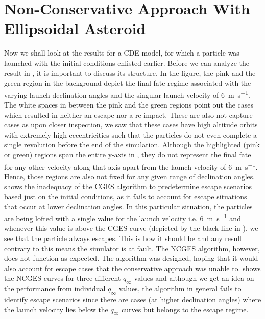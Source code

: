 \section{Non-Conservative Approach With Ellipsoidal Asteroid}
\label{sec:nonconservative_escape_cde_results}
Now we shall look at the results for a \gls{CDE} model, for which a particle was launched with the initial conditions enlisted earlier. Before we can analyze the result in , it is important to discuss its structure. In the figure, the pink and the green region in the background depict the final fate regime associated with the varying launch declination angles and the singular launch velocity of \SI{6}{\metre\per\second}. The white spaces in between the pink and the green regions point out the cases which resulted in neither an escape nor a re-impact. These are also not capture cases as upon closer inspection, we saw that these cases have high altitude orbits with extremely high eccentricities such that the particles do not even complete a single revolution before the end of the simulation. Although the highlighted (pink or green) regions span the entire y-axis in , they do not represent the final fate for any other velocity along that axis apart from the launch velocity of \SI{6}{\metre\per\second}. Hence, those regions are also not fixed for any given range of declination angles.
%
\newline\newline
%
 shows the inadequacy of the \gls{CGES} algorithm to predetermine escape scenarios based just on the initial conditions, as it fails to account for escape situations that occur at lower declination angles. In this particular situation, the particles are being lofted with a single value for the launch velocity i.e. \SI{6}{\metre\per\second} and whenever this value is above the \gls{CGES} curve (depicted by the black line in ), we see that the particle always escapes. This is how it should be and any result contrary to this means the simulator is at fault. The \gls{NCGES} algorithm, however, does not function as expected. The algorithm was designed, hoping that it would also account for escape cases that the conservative approach was unable to.  shows the \gls{NCGES} curves for three different $q_\infty$ values and although we get an idea on the performance from individual $q_\infty$ values, the algorithm in general fails to identify escape scenarios since there are cases (at higher declination angles) where the launch velocity lies below the $q_\infty$ curves but belongs to the escape regime.
